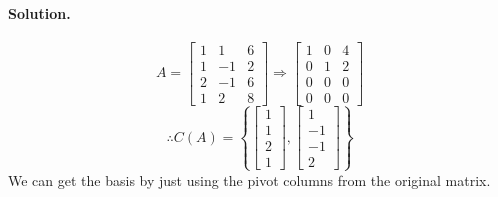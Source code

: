 \paragraph*{Solution.}
$$A=\begin{bmatrix}
    1&1&6\\
    1&-1&2\\
    2&-1&6\\
    1&2&8
\end{bmatrix}\Rightarrow\begin{bmatrix}
    1&0&4\\
    0&1&2\\
    0&0&0\\
    0&0&0
\end{bmatrix}$$
$$\therefore C(A)=\left\{\begin{bmatrix}
    1\\1\\2\\1
\end{bmatrix}, \begin{bmatrix}
    1\\-1\\-1\\2
\end{bmatrix}\right\}$$
We can get the basis by just using the pivot columns from the original matrix.\\

